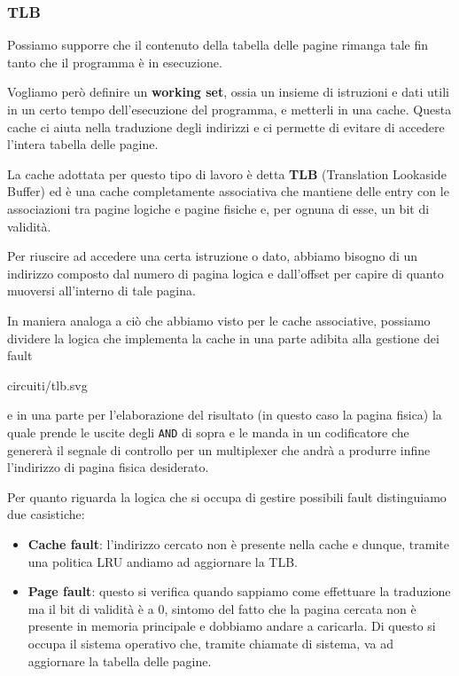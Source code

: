 \subsubsection{TLB}
Possiamo supporre che il contenuto della tabella delle pagine rimanga tale fin tanto che il
programma è in esecuzione.

Vogliamo però definire un \textbf{working set}, ossia un insieme di istruzioni e dati utili in un
certo tempo dell'esecuzione del programma, e metterli in una cache. Questa cache ci aiuta nella
traduzione degli indirizzi e ci permette di evitare di accedere l'intera tabella delle pagine.

La cache adottata per questo tipo di lavoro è detta \textbf{TLB} (Translation Lookaside Buffer) ed
è una cache completamente associativa che mantiene delle entry con le associazioni tra pagine
logiche e pagine fisiche e, per ognuna di esse, un bit di validità.

Per riuscire ad accedere una certa istruzione o dato, abbiamo bisogno di un indirizzo composto dal
numero di pagina logica e dall'offset per capire di quanto muoversi all'interno di tale pagina.

In maniera analoga a ciò che abbiamo visto per le cache associative, possiamo dividere la logica
che implementa la cache in una parte adibita alla gestione dei fault
\begin{center}
	 {circuiti/tlb.svg}
\end{center}
e in una parte per l'elaborazione del risultato (in questo caso la pagina fisica) la quale prende
le uscite degli \verb|AND| di sopra e le manda in un codificatore che genererà il segnale di
controllo per un multiplexer che andrà a produrre infine l'indirizzo di pagina fisica desiderato.

Per quanto riguarda la logica che si occupa di gestire possibili fault distinguiamo due casistiche:
\begin{itemize}
	\item \textbf{Cache fault}: l'indirizzo cercato non è presente nella cache e dunque, tramite
	      una politica LRU andiamo ad aggiornare la TLB.
	\item \textbf{Page fault}: questo si verifica quando sappiamo come effettuare la traduzione ma
	      il bit di validità è a 0, sintomo del fatto che la pagina cercata non è presente in
	      memoria principale e dobbiamo andare a caricarla. Di questo si occupa il sistema
	      operativo che, tramite chiamate di sistema, va ad aggiornare la tabella delle pagine.
\end{itemize}

